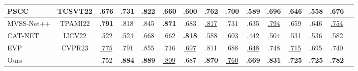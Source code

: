 \documentclass[10pt,journal,compsoc]{IEEEtran}
\begin{document}
\begin{table*}
{\begin{tabular}{lcccccccccccccc}
    PSCC \cite{liu2022pscc} & TCSVT22 & .676 & .731 & .822 & .660 & .600 & .762 & .700 & .589 & .696 & .646 & .558 & .676\\ 								
    \midrule									
    MVSS-Net++ \cite{dong2022mvss} & TPAMI22 & \textbf{.791} & .818 & .845 & \textbf{.871} & .683 & \underline{.817} & .731 & .635 & \underline{.794} & .659 & .646 & \underline{.754}\\	
    \midrule	
    CAT-NET \cite{kwon2022learning} & IJCV22 & .522 & .524 & .668 & .662 & \textbf{.818} & .588 & .603 & .442 & .504 & .531 & .536 & .582\\	
    \midrule 									
    EVP \cite{liu2023evp} & CVPR23 & \underline{.775} & .791 & .855 & .716 & \underline{.697} & .811 & .688 & \underline{.648} & .748 & \underline{.715} & .695 & .740 \\	
    \midrule[1.5pt]
    Ours & - & {.752} & \textbf{.884} & \textbf{.889} & \underline{.809} & .687 & \textbf{.870} & \underline{.760} & \textbf{.669} & \textbf{.831} & \textbf{.725} & \textbf{.725} & \textbf{.782} \\
    \bottomrule
  \end{tabular}}
  \label{auc_table}
\end{table*} 
\end{document}
